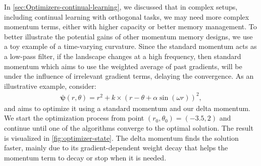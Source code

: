 {
In \autoref{sec:Optimizers-continual-learning}, we discussed that in complex setups, including continual learning with orthogonal tasks, we may need more complex momentum terms, either with higher capacity or better memory management. To better illustrate the potential gains of other momentum memory designs, we use a toy example of a time-varying curvature. Since the standard momentum acts as a low-pass filter, if the  landscape changes at a high frequency, then standard momentum which aims to use the weighted average of past gradients, will be under the influence of irrelevant gradient terms, delaying the convergence. As an illustrative example, consider: 
\begin{align}
    \boldsymbol{\psi}(r, \theta) = r^2 + k \times \left( r - \theta + \alpha \sin{\left(\omega r\right)} \right)^{2},
\end{align}
and aims to optimize it using a standard momentum and our delta momentum. We start the optimization process from point $(r_0, \theta_0) = (-3.5, 2)$ and continue until one of the algorithms converge to the optimal solution. The result is visualized in \autoref{fig:optimizer-state}. The delta momentum finds the solution faster, mainly due to its gradient-dependent weight decay that helps the momentum term to decay or stop when it is needed.  























\vspace{2ex}
}
